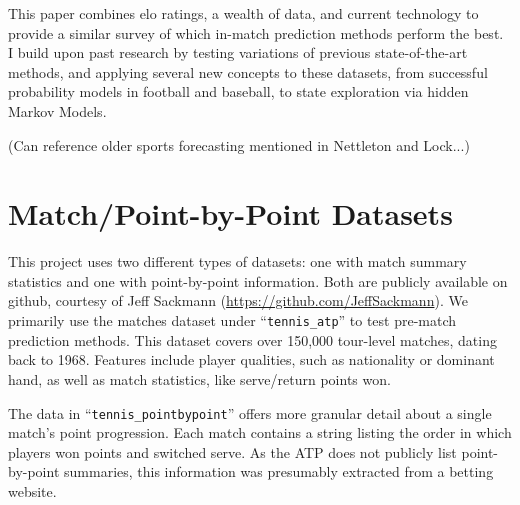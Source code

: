 \documentclass[chapterprefix=false]{report}
\begin{document}

This paper combines elo ratings, a wealth of data, and current technology to provide a similar survey of which in-match prediction methods perform the best. I build upon past research by testing variations of previous state-of-the-art methods, and applying several new concepts to these datasets, from successful probability models in football and baseball, to state exploration via hidden Markov Models.

 (Can reference older sports forecasting mentioned in Nettleton and Lock...)

 
\section{Match/Point-by-Point Datasets}
 
 This project uses two different types of datasets: one with match summary statistics and one with point-by-point information. Both are publicly available on github, courtesy of Jeff Sackmann (\url{https://github.com/JeffSackmann}). We primarily use the matches dataset under ``\texttt{tennis\_atp}'' to test pre-match prediction methods. This dataset covers over 150,000 tour-level matches, dating back to 1968. Features include player qualities, such as nationality or dominant hand, as well as match statistics, like serve/return points won.
 
 
 The data in ``\texttt{tennis\_pointbypoint}'' offers more granular detail about a single match's point progression. Each match contains a string listing the order in which players won points and switched serve. As the ATP does not publicly list point-by-point summaries, this information was presumably extracted from a betting website.
\end{document}

